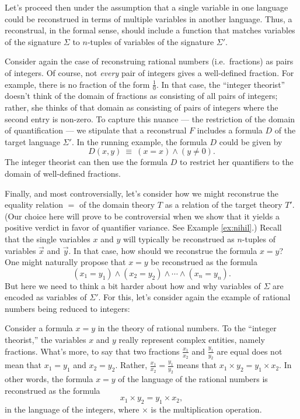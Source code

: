 Let's proceed then under the assumption that a single variable in one
language could be reconstrued in terms of multiple variables in
another language.  Thus, a reconstrual, in the formal sense, should
include a function that matches variables of the signature $\Sigma$ to
$n$-tuples of variables of the signature $\Sigma'$.

Consider again the case of reconstruing rational numbers (i.e.\
fractions) as pairs of integers.  Of course, not {\it every} pair of
integers gives a well-defined fraction.  For example, there is no
fraction of the form $\frac{1}{0}$.  In that case, the ``integer
theorist'' doesn't think of the domain of fractions as consisting of
all pairs of integers; rather, she thinks of that domain as consisting
of pairs of integers where the second entry is non-zero.  To capture
this nuance --- the restriction of the domain of quantification --- we
stipulate that a reconstrual $F$ includes a formula $D$ of the target
language $\Sigma '$.  In the running example, the formula $D$ could be
given by
\[ D(x,y) \: \equiv \: (x=x)\wedge (y\neq 0) .\] The integer theorist
can then use the formula $D$ to restrict her quantifiers to the domain
of well-defined fractions.

Finally, and most controversially, let's consider how we might
reconstrue the equality relation $=$ of the domain theory $T$ as a
relation of the target theory $T'$.  (Our choice here will prove to be
controversial when we show that it yields a positive verdict in favor
of quantifier variance.  See Example \ref{ex:nihil}.)  Recall that the
single variables $x$ and $y$ will typically be reconstrued as
$n$-tuples of variables $\vec{x}$ and $\vec{y}$.  In that case, how
should we reconstrue the formula $x=y$?  One might naturally propose
that $x=y$ be reconstrued as the formula
\begin{equation} (x_1=y_1)\wedge (x_2=y_2)\wedge \cdots \wedge
  (x_n=y_n) .\label{simple} \end{equation} But here we need to think a
bit harder about how and why variables of $\Sigma$ are encoded as
variables of $\Sigma '$.  For this, let's consider again the example
of rational numbers being reduced to integers:

Consider a formula $x=y$ in the theory of rational numbers.  To the
``integer theorist,'' the variables $x$ and $y$ really represent
complex entities, namely fractions.  What's more, to say that two
fractions $\frac{x_1}{x_2}$ and $\frac{y_1}{y_2}$ are equal does not
mean that $x_1=y_1$ and $x_2=y_2$.  Rather,
$\frac{x_1}{x_2}=\frac{y_1}{y_2}$ means that
$x_1\times y_2=y_1\times x_2$.  In other words, the formula $x=y$ of
the language of the rational numbers is reconstrued as the formula
\begin{equation} x_1\times y_2=y_1\times x_2
  ,\label{foo} \end{equation} in the language of the integers, where
$\times$ is the multiplication operation.

